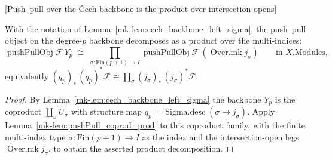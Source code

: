 \begin{lemma}

[Push--pull over the {\v C}ech backbone is the product over intersection opens]
  \label{mk-lem:pushPull_sigma_iso}

  With the notation of Lemma~\ref{mk-lem:cech_backbone_left_sigma}, the push--pull object on
  the degree-\(p\) backbone decomposes as a product over the multi-indices:
  \[
    \operatorname{pushPullObj}\mathcal{F}\,Y_p
      \;\cong\;
    \prod_{\sigma : \mathrm{Fin}(p+1) \to I}
      \operatorname{pushPullObj}\mathcal{F}\,(\operatorname{Over.mk} j_\sigma)
    \qquad \text{in } X.\mathrm{Modules},
  \]
  equivalently \((q_p)_*\,(q_p)^*\mathcal{F} \cong \prod_\sigma (j_\sigma)_*\,
  (j_\sigma)^*\mathcal{F}\).
\end{lemma}
\begin{proof}
  By Lemma~\ref{mk-lem:cech_backbone_left_sigma} the backbone \(Y_p\) is the coproduct
  \(\coprod_\sigma U_\sigma\) with structure map \(q_p = \operatorname{Sigma.desc}(\sigma
  \mapsto j_\sigma)\). Apply Lemma~\ref{mk-lem:pushPull_coprod_prod} to this coproduct family,
  with the finite multi-index type \(\sigma : \mathrm{Fin}(p+1) \to I\) as the index and the
  intersection-open legs \(\operatorname{Over.mk} j_\sigma\), to obtain the asserted product
  decomposition.
\end{proof}

